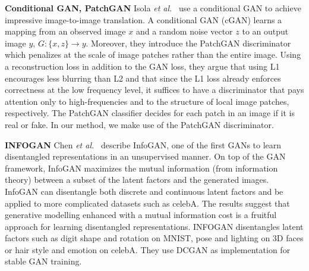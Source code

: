 \documentclass[a4paper,12pt]{report}
\begin{document}
\par \textbf{Conditional GAN, PatchGAN} Isola \textit{et al.}~\cite{CondGAN_PatchGAN} use a conditional GAN to achieve impressive image-to-image translation. A conditional GAN (cGAN) learns a mapping from an observed image $x$ and a random noise vector $z$ to an output image $y$, $G : \{x,z\} \rightarrow y$. Moreover, they introduce the PatchGAN discriminator which penalizes at the scale of image patches rather than the entire image. Using a reconstruction loss in addition to the GAN loss, they argue that using L1 encourages less blurring than L2 and that since the L1 loss already enforces correctness at the low frequency level, it suffices to have a discriminator that pays attention only to high-frequencies and to the structure of local image patches, respectively. The PatchGAN classifier decides for each patch in an image if it is real or fake. In our method, we make use of the PatchGAN discriminator.

\par\textbf{INFOGAN} Chen \textit{et al.}~\cite{InfoGAN} describe InfoGAN, one of the first GANs to learn disentangled representations in an unsupervised manner. On top of the GAN framework, InfoGAN maximizes the mutual information (from information theory) between a subset of the latent factors and the generated images. InfoGAN can disentangle both discrete and continuous latent factors and be applied to more complicated datasets such as celebA. The results suggest that generative modelling enhanced with a mutual information cost is a fruitful approach for learning disentangled representations. INFOGAN disentangles latent factors such as digit shape and rotation on MNIST, pose and lighting on 3D faces or hair style and emotion on celebA. They use DCGAN as implementation for stable GAN training. 



\end{document}
